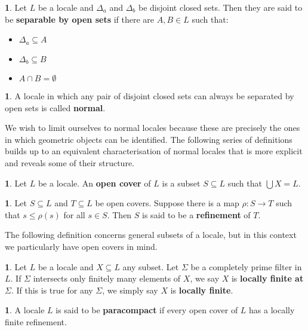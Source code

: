 \documentclass[oneside,english]{amsbook}
\numberwithin{section}{chapter}
\theoremstyle{plain}
\theoremstyle{definition}
\newtheorem{defn}[thm]{\protect\definitionname}
\providecommand{\definitionname}{Definition}
\begin{document}
\begin{defn}
	Let $L$ be a locale and $\Delta_a$ and $\Delta_b$ be disjoint closed sets. Then they are said to be \textbf{separable by open sets} if there are $A, B\in L$ such that:\begin{itemize}
		\item $\Delta_a \subseteq A$
		\item $\Delta_b \subseteq B$
		\item $A\cap B = \emptyset$
	\end{itemize}
\end{defn}

\begin{defn}
	A locale in which any pair of disjoint closed sets can always be separated by open sets is called \textbf{normal}.
\end{defn}

We wish to limit ourselves to normal locales because these are precisely the ones in which geometric objects can be identified. The following series of definitions builds up to an equivalent characterisation of normal locales that is more explicit and reveals some of their structure.

\begin{defn}
	Let $L$ be a locale. An \textbf{open cover} of $L$ is a subset $S\subseteq L$ such that $\bigcup X = L$.
\end{defn}

\begin{defn}
	Let $S\subseteq L$ and $T\subseteq L$ be open covers. Suppose there is a map $\rho:S\to T$ such that $s\le \rho(s)$ for all $s\in S$. Then $S$ is said to be a \textbf{refinement} of $T$.
\end{defn}

The following definition concerns general subsets of a locale, but in this context we particularly have open covers in mind.

\begin{defn}
	Let $L$ be a locale and $X\subseteq L$ any subset. Let $\Sigma$ be a completely prime filter in $L$. If $\Sigma$ intersects only finitely many elements of $X$, we say $X$ is \textbf{locally finite at $\Sigma$}. If this is true for any $\Sigma$, we simply say $X$ is \textbf{locally finite}.
\end{defn}

\begin{defn}A locale $L$ is said to be \textbf{paracompact} if every open cover of $L$ has a locally finite refinement.
\end{defn}
\end{document}
